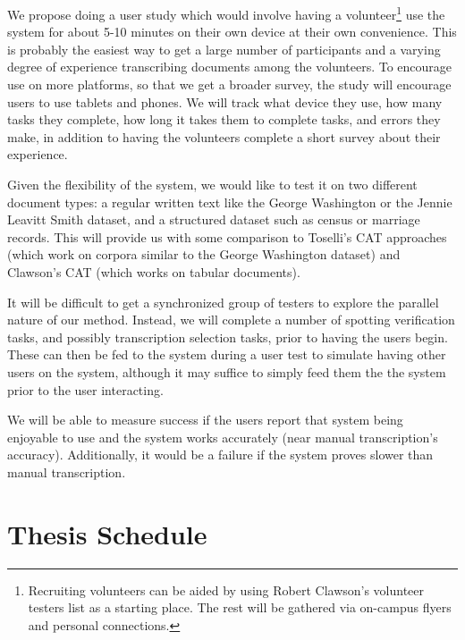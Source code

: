 \documentclass[ms]{byuprop}
\begin{document}
We propose doing a user study which would involve having a volunteer\footnote{Recruiting volunteers can be aided by using Robert Clawson's volunteer testers list as a starting place. The rest will be gathered via on-campus flyers and personal connections.} use the system for about 5-10 minutes on their own device at their own convenience. This is probably the easiest way to get a large number of participants and a varying degree of experience transcribing documents among the volunteers. To encourage use on more platforms, so that we get a broader survey, the study will encourage users to use tablets and phones.
We will track what device they use, how many tasks they complete, how long it takes them to complete tasks, and errors they make, in addition to having the volunteers complete a short survey about their experience.

Given the flexibility of the system, we would like to test it on two different document types: a regular written text like the George Washington \cite{GW} or the Jennie Leavitt Smith \cite{Smith} dataset, and a structured dataset such as census or marriage records. This will provide us with some comparison to Toselli's CAT approaches (which work on corpora similar to the George Washington dataset) and Clawson's CAT (which works on tabular documents).

It will be difficult to get a synchronized group of testers to explore the parallel nature of our method. Instead, we will complete a number of spotting verification tasks, and possibly transcription selection tasks, prior to having the users begin. These can then be fed to the system during a user test to simulate having other users on the system, although it may suffice to simply feed them the the system prior to the user interacting.

We will be able to measure success if the users report that system being enjoyable to use and the system works accurately (near manual transcription's accuracy). Additionally, it would be a failure if the system proves slower than manual transcription.


\section{Thesis Schedule}
\end{document}
